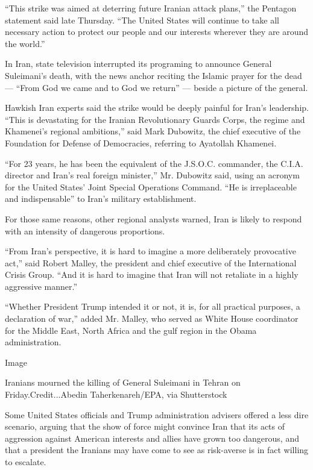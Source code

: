 ``This strike was aimed at deterring future Iranian attack plans,'' the
Pentagon statement said late Thursday. ``The United States will continue
to take all necessary action to protect our people and our interests
wherever they are around the world.''

In Iran, state television interrupted its programing to announce General
Suleimani's death, with the news anchor reciting the Islamic prayer for
the dead --- ``From God we came and to God we return'' --- beside a
picture of the general.

Hawkish Iran experts said the strike would be deeply painful for Iran's
leadership. ``This is devastating for the Iranian Revolutionary Guards
Corps, the regime and Khamenei's regional ambitions,'' said Mark
Dubowitz, the chief executive of the Foundation for Defense of
Democracies, referring to Ayatollah Khamenei.

``For 23 years, he has been the equivalent of the J.S.O.C. commander,
the C.I.A. director and Iran's real foreign minister,'' Mr. Dubowitz
said, using an acronym for the United States' Joint Special Operations
Command. ``He is irreplaceable and indispensable'' to Iran's military
establishment.

For those same reasons, other regional analysts warned, Iran is likely
to respond with an intensity of dangerous proportions.

``From Iran's perspective, it is hard to imagine a more deliberately
provocative act,'' said Robert Malley, the president and chief executive
of the International Crisis Group. ``And it is hard to imagine that Iran
will not retaliate in a highly aggressive manner.''

``Whether President Trump intended it or not, it is, for all practical
purposes, a declaration of war,'' added Mr. Malley, who served as White
House coordinator for the Middle East, North Africa and the gulf region
in the Obama administration.

Image

Iranians mourned the killing of General Suleimani in Tehran on
Friday.Credit...Abedin Taherkenareh/EPA, via Shutterstock

Some United States officials and Trump administration advisers offered a
less dire scenario, arguing that the show of force might convince Iran
that its acts of aggression against American interests and allies have
grown too dangerous, and that a president the Iranians may have come to
see as risk-averse is in fact willing to escalate.

